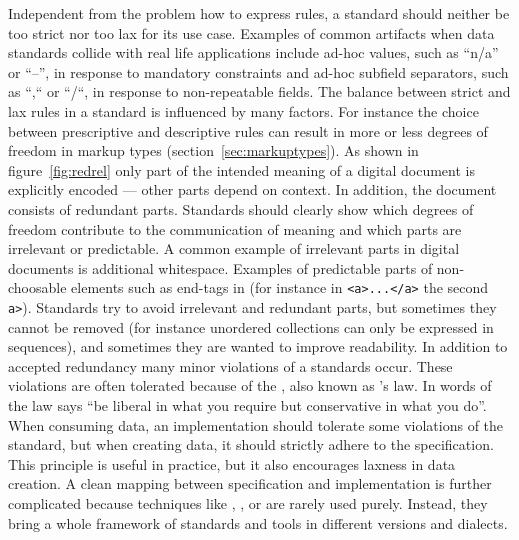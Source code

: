 Independent from the problem how to express rules, a standard should neither be
too strict nor too lax for its use case. Examples of common artifacts when data
standards collide with real life applications include ad-hoc 
values, such as ``n/a'' or ``--'', in response to mandatory constraints and
ad-hoc subfield separators, such as ``,`` or ``/``, in response to
non-repeatable fields.  The balance between strict and lax rules in a standard
is influenced by many factors. For instance the choice between prescriptive and
descriptive rules can result in more or less degrees of freedom in markup types
(section~\ref{sec:markuptypes}). As shown in figure~\ref{fig:redrel} only part
of the intended meaning of a digital document is explicitly encoded --- other
parts depend on context. In addition, the document consists of redundant parts.
Standards should clearly show which degrees of freedom contribute to the
communication of meaning and which parts are irrelevant or predictable. A
common example of irrelevant parts in digital documents is additional
whitespace. Examples of predictable parts of non-choosable elements such as
end-tags in  (for instance in \verb|<a>...</a>| the second
\verb|a>|).  Standards try to avoid irrelevant and redundant parts, but
sometimes they cannot be removed (for instance unordered collections can only
be expressed in sequences), and sometimes they are wanted to improve
readability. In addition to accepted redundancy many minor violations of a
standards occur. These violations are often tolerated because of the
, also known as 's law. In words
of \textcite{BernersLee1998b} the law says ``be liberal in what you require but
conservative in what you do''.  When consuming data, an implementation should
tolerate some violations of the standard, but when creating data, it should
strictly adhere to the specification.  This principle is useful in practice,
but it also encourages laxness in data creation.  A clean mapping between
specification and implementation is further complicated because techniques like
, , or  are rarely used purely. Instead, they
bring a whole framework of standards and tools in different versions and
dialects.

